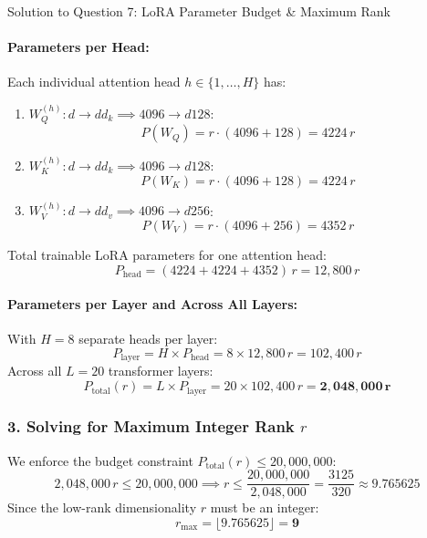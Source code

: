 \documentclass[11pt,a4paper]{article}
\begin{document}
\begin{solutionbox}{Solution to Question 7: LoRA Parameter Budget \& Maximum Rank}
\paragraph{Parameters per Head:}
Each individual attention head $h \in \{1, \dots, H\}$ has:
\begin{enumerate}[noitemsep]
    \item $W_Q^{(h)}: d \to dd_k \implies 4096 \to d128$:
    \begin{equation*}
    P(W_Q) = r \cdot (4096 + 128) = 4224 \, r
    \end{equation*}
    \item $W_K^{(h)}: d \to dd_k \implies 4096 \to d128$:
    \begin{equation*}
    P(W_K) = r \cdot (4096 + 128) = 4224 \, r
    \end{equation*}
    \item $W_V^{(h)}: d \to dd_v \implies 4096 \to d256$:
    \begin{equation*}
    P(W_V) = r \cdot (4096 + 256) = 4352 \, r
    \end{equation*}
\end{enumerate}
Total trainable LoRA parameters for one attention head:
\begin{equation*}
P_{\text{head}} = (4224 + 4224 + 4352) \, r = 12{,}800 \, r
\end{equation*}

\paragraph{Parameters per Layer and Across All Layers:}
With $H = 8$ separate heads per layer:
\begin{equation*}
P_{\text{layer}} = H \times P_{\text{head}} = 8 \times 12{,}800 \, r = 102{,}400 \, r
\end{equation*}
Across all $L = 20$ transformer layers:
\begin{equation*}
P_{\text{total}}(r) = L \times P_{\text{layer}} = 20 \times 102{,}400 \, r = \mathbf{2{,}048{,}000 \, r}
\end{equation*}

\subsubsection*{3. Solving for Maximum Integer Rank $r$}
We enforce the budget constraint $P_{\text{total}}(r) \le 20{,}000{,}000$:
\begin{equation*}
2{,}048{,}000 \, r \le 20{,}000{,}000 \implies r \le \frac{20{,}000{,}000}{2{,}048{,}000} = \frac{3125}{320} \approx 9.765625
\end{equation*}
Since the low-rank dimensionality $r$ must be an integer:
\begin{equation*}
r_{\max} = \lfloor 9.765625 \rfloor = \mathbf{9}
\end{equation*}


\end{solutionbox}
\end{document}
